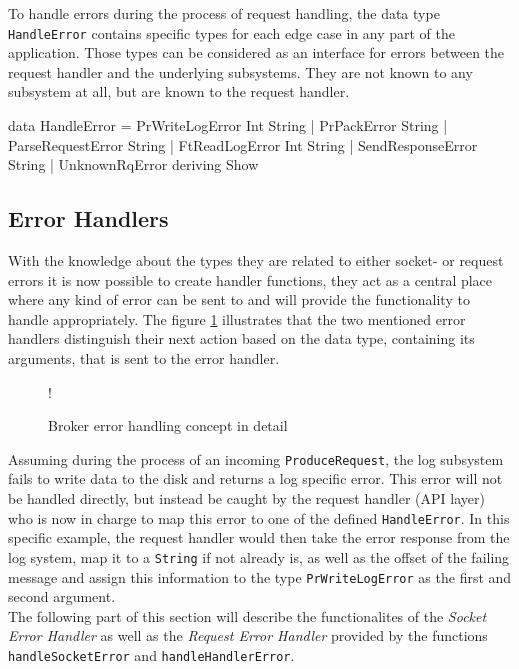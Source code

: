 To handle errors during the process of request handling, the data type
\lstinline{HandleError} contains specific types for each edge case in any part
of the application. Those types can be considered as an interface for errors
between the request handler and the underlying subsystems. They are not known to
any subsystem at all, but are known to the request handler.

\begin{code}
data HandleError =
        PrWriteLogError Int String
      | PrPackError String
      | ParseRequestError String
      | FtReadLogError Int String
      | SendResponseError String
      | UnknownRqError
        deriving Show
\end{code}


\subsection{Error Handlers}

With the knowledge about the types they are related to either socket- or request
errors it is now possible to create handler functions, they act as a central
place where any kind of error can be sent to and will provide the
functionality to handle appropriately. The figure
\ref{fig:broker-error-activity-detail} illustrates that the two
mentioned error handlers distinguish their next action based on the data type,
containing its arguments, that is sent to the error handler.

\begin{figure}[H]
  \centering
   {!} {
    
  }
  \caption{Broker error handling concept in detail}
  \label{fig:broker-error-activity-detail}
\end{figure}

Assuming during the process of an incoming \lstinline{ProduceRequest}, the log
subsystem fails to write data to the disk and returns a log specific error. This
error will not be handled directly, but instead be caught by the request handler
(API layer) who is now in charge to map this error to one of the defined
\lstinline{HandleError}. In this specific example, the request handler would
then take the error response from the log system, map it to a \lstinline{String}
if not already is, as well as the offset of the failing message and assign this
information to the type \lstinline{PrWriteLogError} as the first and second
argument. \\

The following part of this section will describe the functionalites of the
\textit{Socket Error Handler} as well as the \textit{Request Error Handler}
provided by the functions \lstinline{handleSocketError} and
\lstinline{handleHandlerError}.

